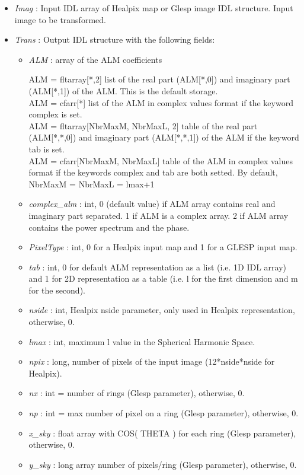 \begin{itemize}
\item {\em Imag} : Input IDL array of Healpix map or Glesp image IDL structure. Input image to be transformed.
\item {\em Trans} : Output IDL structure with the following fields:
\begin{itemize}
\item {\em ALM} : array of the ALM coefficients
\begin{center}
ALM = fltarray[*,2] list of the real part (ALM[*,0]) and imaginary part (ALM[*,1]) of the ALM. This is the default storage.\\
ALM = cfarr[*] list of the ALM in complex values format if the keyword complex is set.\\
ALM = fltarray[NbrMaxM, NbrMaxL, 2] table of the real part (ALM[*,*,0]) and imaginary part (ALM[*,*,1]) of the ALM if the keyword tab is set.\\
ALM = cfarr[NbrMaxM, NbrMaxL] table of the ALM in complex values format if the keywords complex and tab are both setted. By default, NbrMaxM = NbrMaxL = lmax+1
\end{center}
\item {\em complex\_alm} : int, 0 (default value) if ALM array contains real and imaginary part separated. 
1 if ALM is a complex array. 2 if ALM array contains the power spectrum and the phase.
\item {\em PixelType} : int, 0 for a Healpix input map and 1 for a GLESP input map.
\item {\em tab} : int, 0 for default ALM representation as a list (i.e. 1D IDL array) and 1 for 2D 
representation as a table (i.e. l for the first dimension and m for the second).
\item {\em nside} : int, Healpix nside parameter, only used in Healpix representation, otherwise, 0.
\item {\em lmax} : int, maximum l value in the Spherical Harmonic Space.
\item {\em npix} : long, number of pixels of the input image (12*nside*nside for Healpix).
\item {\em nx} : int = number of rings (Glesp parameter), otherwise, 0.
\item {\em np} : int = max number of pixel on a ring (Glesp parameter), otherwise, 0.
\item {\em x\_sky} : float array with COS( THETA ) for each ring (Glesp parameter), otherwise, 0.
\item {\em y\_sky} : long array number of pixels/ring (Glesp parameter), otherwise, 0.

\end{itemize}
\end{itemize}
